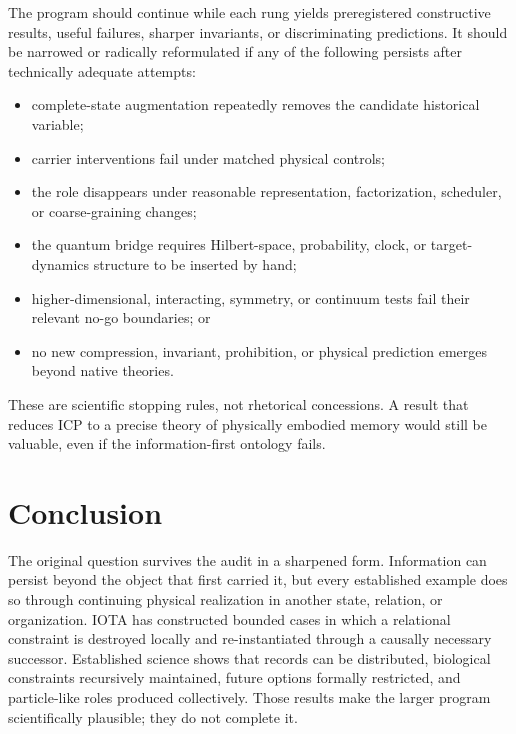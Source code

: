 The program should continue while each rung yields preregistered constructive
results, useful failures, sharper invariants, or discriminating predictions.
It should be narrowed or radically reformulated if any of the following
persists after technically adequate attempts:
\begin{itemize}
  \item complete-state augmentation repeatedly removes the candidate
  historical variable;
  \item carrier interventions fail under matched physical controls;
  \item the role disappears under reasonable representation, factorization,
  scheduler, or coarse-graining changes;
  \item the quantum bridge requires Hilbert-space, probability, clock, or
  target-dynamics structure to be inserted by hand;
  \item higher-dimensional, interacting, symmetry, or continuum tests fail
  their relevant no-go boundaries; or
  \item no new compression, invariant, prohibition, or physical prediction
  emerges beyond native theories.
\end{itemize}

These are scientific stopping rules, not rhetorical concessions. A result that
reduces ICP to a precise theory of physically embodied memory would still be
valuable, even if the information-first ontology fails.

\section{Conclusion}

The original question survives the audit in a sharpened form. Information can
persist beyond the object that first carried it, but every established example
does so through continuing physical realization in another state, relation, or
organization. IOTA has constructed bounded cases in which a relational
constraint is destroyed locally and re-instantiated through a causally
necessary successor. Established science shows that records can be distributed,
biological constraints recursively maintained, future options formally
restricted, and particle-like roles produced collectively. Those results make
the larger program scientifically plausible; they do not complete it.

